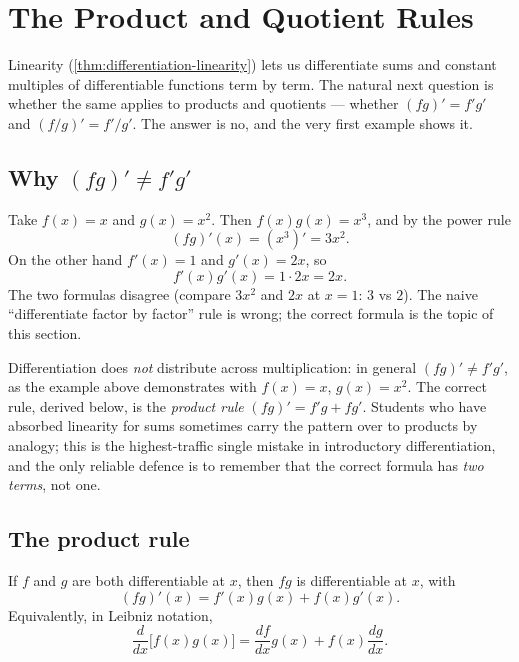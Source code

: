 \section{The Product and Quotient Rules}\label{sec:product-quotient-rules}

Linearity (\cref{thm:differentiation-linearity}) lets us differentiate sums and constant multiples of differentiable functions term by term. The natural next question is whether the same applies to products and quotients --- whether \((f g)' = f' g'\) and \((f / g)' = f' / g'\). The answer is no, and the very first example shows it.

\subsection{Why \texorpdfstring{$(fg)' \neq f' g'$}{(fg)' is not f'g'}}

Take \(f(x) = x\) and \(g(x) = x^{2}\). Then \(f(x) g(x) = x^{3}\), and by the power rule
\[
(f g)'(x) = (x^{3})' = 3 x^{2}.
\]
On the other hand \(f'(x) = 1\) and \(g'(x) = 2 x\), so
\[
f'(x) g'(x) = 1 \cdot 2 x = 2 x.
\]
The two formulas disagree (compare \(3 x^{2}\) and \(2 x\) at \(x = 1\): \(3\) vs \(2\)). The naive ``differentiate factor by factor'' rule is wrong; the correct formula is the topic of this section.

\begin{caution}
Differentiation does \emph{not} distribute across multiplication: in general \((f g)' \neq f' g'\), as the example above demonstrates with \(f(x) = x\), \(g(x) = x^{2}\). The correct rule, derived below, is the \emph{product rule} \((f g)' = f' g + f g'\). Students who have absorbed linearity for sums sometimes carry the pattern over to products by analogy; this is the highest-traffic single mistake in introductory differentiation, and the only reliable defence is to remember that the correct formula has \emph{two terms}, not one.
\end{caution}

\subsection{The product rule}

\begin{theorem}\label{thm:product-rule}
If \(f\) and \(g\) are both differentiable at \(x\), then \(f g\) is differentiable at \(x\), with
\[
(f g)'(x) = f'(x) g(x) + f(x) g'(x).
\]
Equivalently, in Leibniz notation,
\[
\frac{d}{dx}\bigl[f(x) g(x)\bigr] = \frac{df}{dx} g(x) + f(x) \frac{dg}{dx}.
\]
\end{theorem}

